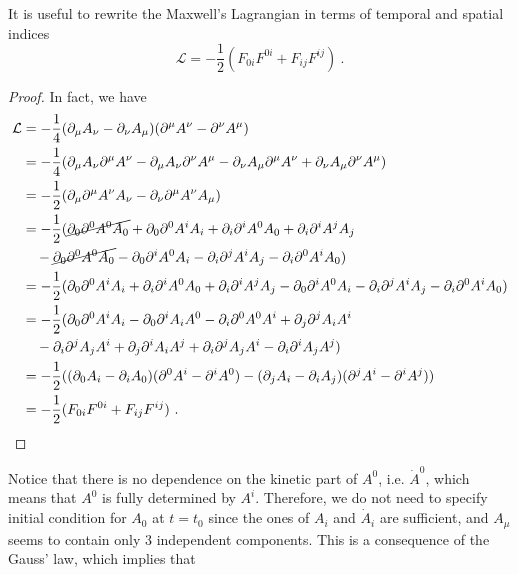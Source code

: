     It is useful to rewrite the Maxwell's Lagrangian in terms of temporal and spatial indices
    \begin{equation*}
        \mathcal L = - \frac{1}{2} (F_{0i} F^{0i} + F_{ij} F^{ij} ) ~.
    \end{equation*} 
    \begin{proof}
        In fact, we have 
        \begin{equation*}
        \begin{aligned}
            \mathcal L & = - \frac{1}{4} (\partial_\mu A_\nu - \partial_\nu A_\mu)(\partial^\mu A^\nu - \partial^\nu A^\mu) \\ & = -\frac{1}{4} (\partial_\mu A_\nu \partial^\mu A^\nu - \partial_\mu A_\nu \partial^\nu A^\mu -  \partial_\nu A_\mu \partial^\mu A^\nu + \partial_\nu A_\mu \partial^\nu A^\mu) \\ & = - \frac{1}{2} (\partial_\mu \partial^\mu A^\nu A_\nu - \partial_\nu \partial^\mu A^\nu A_\mu) \\ & = - \frac{1}{2} (\cancel{\partial_0 \partial^0 A^0 A_0} + \partial_0 \partial^0 A^i A_i + \partial_i \partial^i A^0 A_0 + \partial_i \partial^i A^j A_j \\ & \quad - \cancel{\partial_0 \partial^0 A^0 A_0} - \partial_0 \partial^i A^0 A_i - \partial_i \partial^j A^i A_j - \partial_i \partial^0 A^i A_0) \\ & = - \frac{1}{2} (\partial_0 \partial^0 A^i A_i + \partial_i \partial^i A^0 A_0 + \partial_i \partial^i A^j A_j - \partial_0 \partial^i A^0 A_i - \partial_i \partial^j A^i A_j - \partial_i \partial^0 A^i A_0) \\ & = - \frac{1}{2} 
            (\partial_0 \partial^0 A^i A_i - \partial_0 \partial^i A_i A^0 - \partial_i  \partial^0 A^0 A^i + \partial_j \partial^j A_i A^i \\ & \quad - \partial_i \partial^j A_j A^i + \partial_j \partial^i A_i A^j + \partial_i \partial^j A_j A^i - \partial_i \partial^i A_j A^j ) \\ & = - \frac{1}{2} ((\partial_0 A_i - \partial_i A_0) (\partial^0 A^i - \partial^i A^0) - (\partial_j A_i - \partial_i A_j) (\partial^j A^i - \partial^i A^j)) \\ & = - \frac{1}{2} (F_{0i} F^{0i} + F_{ij} F^{ij} ) ~.
        \end{aligned}
        \end{equation*}
    \end{proof}
    Notice that there is no dependence on the kinetic part of $A^0$, i.e. $\dot A^0$, which means that $A^0$ is fully determined by $A^i$. Therefore, we do not need to specify initial condition for $A_0$ at $t=t_0$ since the ones of $A_i$ and $\dot A_i$ are sufficient, and $A_\mu$ seems to contain only $3$ independent components. This is a consequence of the Gauss' law, which implies that
